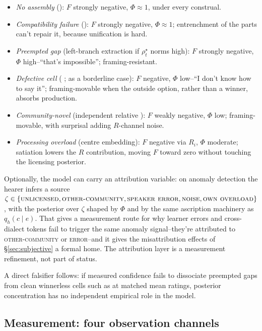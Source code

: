 \begin{itemize}
\item \emph{No assembly} (): $F$ strongly negative, $\Phi\approx1$, under every construal.
\item \emph{Compatibility failure} (): $F$ strongly negative, $\Phi\approx1$; entrenchment of the parts can't repair it, because unification is hard.
\item \emph{Preempted gap} (left-branch extraction if $\rho_t^\star$ norms high): $F$ strongly negative, $\Phi$ high--\enquote{that's impossible}; framing-resistant.
\item \emph{Defective cell} ( ;  as a borderline case): $F$ negative, $\Phi$ low--\enquote{I don't know how to say it}; framing-movable when the outside option, rather than a winner, absorbs production.
\item \emph{Community-novel} (independent relative ): $F$ weakly negative, $\Phi$ low; framing-movable, with surprisal adding $R$-channel noise.
\item \emph{Processing overload} (centre embedding): $F$ negative via $R_i$, $\Phi$ moderate; satiation lowers the $R$ contribution, moving $F$ toward zero without touching the licensing posterior.
\end{itemize}

Optionally, the model can carry an attribution variable: on anomaly detection
the hearer infers a source
$\zeta\in\{\textsc{unlicensed},\textsc{other-community},\textsc{speaker error},
\textsc{noise},\textsc{own overload}\}$, with the posterior over $\zeta$ shaped
by $\Phi$ and by the same ascription machinery as $q_h(c\mid e)$. That gives a
measurement route for why learner errors and cross-dialect tokens fail to
trigger the same anomaly signal--they're attributed to \textsc{other-community}
or \textsc{error}--and it gives the misattribution effects of
\S\ref{sec:subjective} a formal home. The attribution layer is a measurement
refinement, not part of status.

A direct falsifier follows: if measured confidence fails to dissociate preempted
gaps from clean winnerless cells such as   at
matched mean ratings, posterior concentration has no independent empirical role
in the model.

\subsection{Measurement: four observation channels}
\label{sec:measurement-C}


